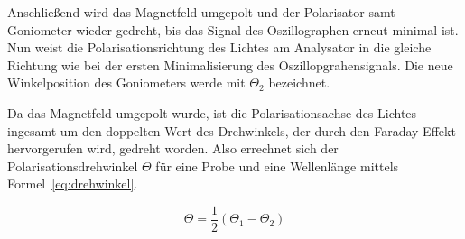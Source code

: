 Anschließend wird das Magnetfeld umgepolt und der 
Polarisator samt Goniometer wieder gedreht, bis 
das Signal des Oszillographen erneut minimal ist. 
Nun weist die Polarisationsrichtung des Lichtes am 
Analysator in die gleiche Richtung wie bei der ersten 
Minimalisierung des Oszillopgrahensignals. Die neue 
Winkelposition des Goniometers werde mit $\Theta_2$ 
bezeichnet.

Da das Magnetfeld umgepolt wurde, ist die Polarisationsachse des 
Lichtes ingesamt um den doppelten Wert des Drehwinkels, der durch 
den Faraday-Effekt hervorgerufen wird, gedreht worden. 
Also errechnet sich der Polarisationsdrehwinkel $\Theta$ für eine 
Probe und eine Wellenlänge mittels Formel~\eqref{eq:drehwinkel}.

\begin{equation}
\Theta = \frac{1}{2}(\Theta_1 - \Theta_2)
\label{eq:drehwinkel}
\end{equation}
%
